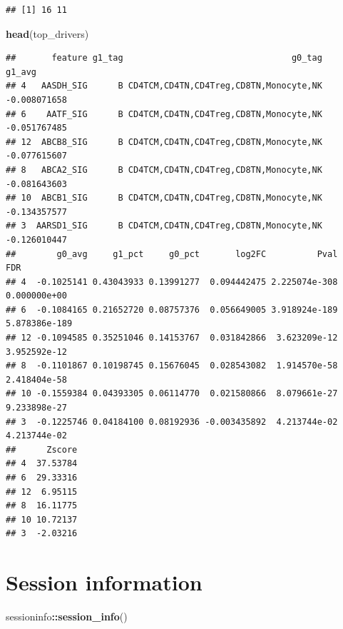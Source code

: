 \documentclass[
  12pt,
]{book}
\newenvironment{Shaded}{\begin{snugshade}}{\end{snugshade}}
\newcommand{\FunctionTok}[1]{\textcolor[rgb]{0.13,0.29,0.53}{\textbf{#1}}}
\newcommand{\NormalTok}[1]{#1}
\newcommand{\SpecialCharTok}[1]{\textcolor[rgb]{0.81,0.36,0.00}{\textbf{#1}}}
\begin{document}
\begin{verbatim}
## [1] 16 11
\end{verbatim}

\begin{Shaded}
\begin{Highlighting}[]
\FunctionTok{head}\NormalTok{(top\_drivers)}
\end{Highlighting}
\end{Shaded}

\begin{verbatim}
##       feature g1_tag                                 g0_tag       g1_avg
## 4   AASDH_SIG      B CD4TCM,CD4TN,CD4Treg,CD8TN,Monocyte,NK -0.008071658
## 6    AATF_SIG      B CD4TCM,CD4TN,CD4Treg,CD8TN,Monocyte,NK -0.051767485
## 12  ABCB8_SIG      B CD4TCM,CD4TN,CD4Treg,CD8TN,Monocyte,NK -0.077615607
## 8   ABCA2_SIG      B CD4TCM,CD4TN,CD4Treg,CD8TN,Monocyte,NK -0.081643603
## 10  ABCB1_SIG      B CD4TCM,CD4TN,CD4Treg,CD8TN,Monocyte,NK -0.134357577
## 3  AARSD1_SIG      B CD4TCM,CD4TN,CD4Treg,CD8TN,Monocyte,NK -0.126010447
##        g0_avg     g1_pct     g0_pct       log2FC          Pval           FDR
## 4  -0.1025141 0.43043933 0.13991277  0.094442475 2.225074e-308  0.000000e+00
## 6  -0.1084165 0.21652720 0.08757376  0.056649005 3.918924e-189 5.878386e-189
## 12 -0.1094585 0.35251046 0.14153767  0.031842866  3.623209e-12  3.952592e-12
## 8  -0.1101867 0.10198745 0.15676045  0.028543082  1.914570e-58  2.418404e-58
## 10 -0.1559384 0.04393305 0.06114770  0.021580866  8.079661e-27  9.233898e-27
## 3  -0.1225746 0.04184100 0.08192936 -0.003435892  4.213744e-02  4.213744e-02
##      Zscore
## 4  37.53784
## 6  29.33316
## 12  6.95115
## 8  16.11775
## 10 10.72137
## 3  -2.03216
\end{verbatim}

\chapter{Session information}\label{session-information}

\begin{Shaded}
\begin{Highlighting}[]
\NormalTok{sessioninfo}\SpecialCharTok{::}\FunctionTok{session\_info}\NormalTok{()}
\end{Highlighting}
\end{Shaded}
\end{document}
